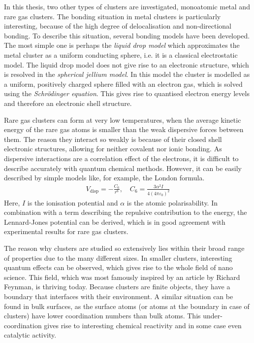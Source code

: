 In this thesis, two other types of clusters are investigated, monoatomic metal
and rare gas clusters. The bonding situation in metal clusters is particularly
interesting, because of the high degree of delocalisation and non-directional
bonding. To describe this situation, several bonding models have been developed.
The most simple one is perhaps the \emph{liquid drop model} which approximates
the metal cluster as a uniform conducting sphere, i.e. it is a classical
electrostatic model. The liquid drop model does not give rise to an electronic
structure, which is resolved in the \textit{spherical jellium model}. In this
model the cluster is modelled as a uniform, positively charged sphere filled
with an electron gas, which is solved using the \textit{Schr\"odinger equation}.
This gives rise to quantised electron energy levels and therefore an electronic
shell structure.

Rare gas clusters can form at very low temperatures, when the average kinetic
energy of the rare gas atoms is smaller than the weak dispersive forces between
them. The reason they interact so weakly is because of their closed shell
electronic structures, allowing for neither covalent nor ionic bonding. As dispersive interactions are a correlation effect of the electrons, it is difficult to describe accurately with quantum chemical methods. However, it can be easily described by simple models like, for example, the London formula.
%
\begin{align}
    V_\text{disp}=-\frac{C_6}{r^6},\quad C_6=\frac{3\alpha^2I}{4\left(4\pi\varepsilon_0\right)^2}
\end{align}
Here, $I$ is the ionisation potential and $\alpha$ is the atomic polarisability.
In combination with a term describing the repulsive contribution to the energy,
the Lennard-Jones potential can be derived, which is in good agreement with
experimental results for rare gas clusters.

The reason why clusters are studied so extensively lies within their broad range
of properties due to the many different sizes. In smaller clusters, interesting
quantum effects can be observed, which gives rise to the whole field of nano
science. This field, which was most famously inspired by an article by Richard
Feynman,\autocite{Feynman_TherePlentyRoom_1960} is thriving today. Because
clusters are finite objects, they have a boundary that interfaces with their
environment. A similar situation can be found in bulk surfaces, as the surface
atoms (or atoms at the boundary in case of clusters) have lower coordination
numbers than bulk atoms. This under-coordination gives rise to interesting
chemical reactivity and in some case even catalytic activity.

